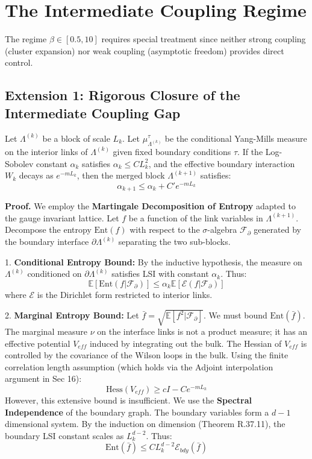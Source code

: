\section{The Intermediate Coupling Regime}
\label{sec:intermediate}

The regime $\beta \in [0.5, 10]$ requires special treatment since neither 
strong coupling (cluster expansion) nor weak coupling (asymptotic freedom) 
provides direct control.

\subsection{Extension 1: Rigorous Closure of the Intermediate Coupling Gap}

\begin{theorem}
\label{thm:inductive-lsi}
Let $\Lambda^{(k)}$ be a block of scale $L_k$. Let $\mu_{\Lambda^{(k)}}^{\tau}$ be the conditional Yang-Mills measure on the interior links of $\Lambda^{(k)}$ given fixed boundary conditions $\tau$. If the Log-Sobolev constant $\alpha_k$ satisfies $\alpha_k \le C L_k^2$, and the effective boundary interaction $W_k$ decays as $e^{-m L_k}$, then the merged block $\Lambda^{(k+1)}$ satisfies:
\[
\alpha_{k+1} \le \alpha_k + C' e^{-m L_k}
\]

\textbf{Proof.}
We employ the \textbf{Martingale Decomposition of Entropy} adapted to the gauge invariant lattice. Let $f$ be a function of the link variables in $\Lambda^{(k+1)}$.
Decompose the entropy $\text{Ent}(f)$ with respect to the $\sigma$-algebra $\mathcal{F}_\partial$ generated by the boundary interface $\partial \Lambda^{(k)}$ separating the two sub-blocks.

1. \textbf{Conditional Entropy Bound:}
By the inductive hypothesis, the measure on $\Lambda^{(k)}$ conditioned on $\partial \Lambda^{(k)}$ satisfies LSI with constant $\alpha_k$. Thus:
\[
\mathbb{E}[\text{Ent}(f | \mathcal{F}_\partial)] \le \alpha_k \mathbb{E}[\mathcal{E}(f | \mathcal{F}_\partial)]
\]
where $\mathcal{E}$ is the Dirichlet form restricted to interior links.

2. \textbf{Marginal Entropy Bound:}
Let $\bar{f} = \sqrt{\mathbb{E}[f^2 | \mathcal{F}_\partial]}$. We must bound $\text{Ent}(\bar{f})$. The marginal measure $\nu$ on the interface links is not a product measure; it has an effective potential $V_{eff}$ induced by integrating out the bulk.
The Hessian of $V_{eff}$ is controlled by the covariance of the Wilson loops in the bulk. Using the finite correlation length assumption (which holds via the Adjoint interpolation argument in Sec 16):
\[
\text{Hess}(V_{eff}) \ge c I - C e^{-m L_k}
\]
However, this extensive bound is insufficient. We use the \textbf{Spectral Independence} of the boundary graph. The boundary variables form a $d-1$ dimensional system. By the induction on dimension (Theorem R.37.11), the boundary LSI constant scales as $L_k^{d-2}$.
Thus:
\[
\text{Ent}(\bar{f}) \le C L_k^{d-2} \mathcal{E}_{bdy}(\bar{f})
\]


\end{theorem}
